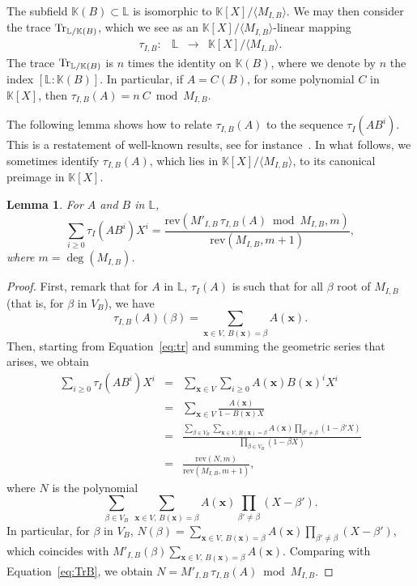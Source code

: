 \documentclass[12pt]{article}
\def\K {\ensuremath{\mathbb{K}}}
\def\L {\ensuremath{\mathbb{L}}}
\def\rev {\ensuremath{\mathrm{rev}}}
\def\x {\ensuremath{\mathbf{x}}}
\newtheorem{Lemma}{Lemma}
\begin{document}
The subfield $\K(B) \subset \L$ is isomorphic to $\K[X]/\langle
M_{I,B} \rangle$. We may then consider the trace
${\rm Tr}_{\L/\K(B)}$, which we see as an $\K[X]/\langle
M_{I,B}\rangle$-linear mapping
$$
\begin{array}{cccc}
\tau_{I,B} :& \L& \to& \K[X]/\langle M_{I,B} \rangle.
\end{array}$$
The trace ${\rm Tr}_{\L/\K(B)}$ is $n$ times the identity on $\K(B)$,
where we denote by $n$ the index $[\L:\K(B)]$. In particular, if
$A=C(B)$, for some polynomial $C$ in $\K[X]$, then $\tau_{I,B}(A)=n
\ C \bmod M_{I,B}$.

The following lemma shows how to relate $\tau_{I,B} (A)$ to the
sequence $\tau_I(A B^i)$. This is a restatement of well-known results,
see for instance~\cite{rouiller99}. In what follows, we sometimes
identify $\tau_{I,B}(A)$, which lies in $\K[X]/\langle M_{I,B} \rangle$,
to its canonical preimage in $\K[X]$.

\begin{Lemma}\label{lemma:trace:1}
  For $A$ and $B$ in $\L$, 
  $$\sum_{i \ge 0} \tau_I(A B^i) X^i = \frac{\rev( M'_{I,B}\, \tau_{I,B}
    (A) \bmod M_{I,B},m)}{\rev(M_{I,B},m+1)},$$ where
  $m=\deg(M_{I,B})$.
\end{Lemma}
\begin{proof}
First, remark that for $A$ in $\L$, $\tau_{I}(A)$ is such that for all
$\beta$ root of $M_{I,B}$ (that is, for $\beta$ in $V_B$), we have
\begin{equation}\label{eq:TrB}
\tau_{I,B}(A)(\beta) = \sum_{\x \in V,\, B(\x)=\beta} A(\x).  
\end{equation}
Then, starting from Equation~\eqref{eq:tr} and summing the geometric
series that arises, we obtain
\begin{eqnarray*}
\sum_{i \ge 0} \tau_I(A B^i) X^i &=& \sum_{\x \in V} \sum_{i \ge 0} A(\x)B(\x)^i X^i\\
&=& \sum_{\x \in V} \frac{A(\x)}{1-B(\x)X}\\
&=& \frac{\sum_{\beta \in V_B} \sum_{\x \in V,\, B(\x)=\beta} A(\x) \prod_{\beta'\ne \beta} (1-\beta' X)}
    {\prod_{\beta \in V_B}(1-\beta X)}\\
&=& \frac{\rev(N,m)}{\rev(M_{I,B},m+1)},
\end{eqnarray*}
where $N$ is the polynomial
$$\sum_{\beta \in V_B}\ \sum_{\x \in V,\, B(\x)=\beta} A(\x) \prod_{\beta'\ne \beta} (X-\beta' ).$$
In particular, for  $\beta$ in $V_B$, $N(\beta)=\sum_{\x \in V,\, B(\x)=\beta} A(\x) \prod_{\beta'\ne \beta} (X-\beta' )$,
which coincides with $M'_{I,B}(\beta)\sum_{\x \in V,\, B(\x)=\beta} A(\x)$.
Comparing with Equation~\eqref{eq:TrB}, we obtain 
$N=M'_{I,B}\, \tau_{I,B}(A) \bmod M_{I,B}$.
\end{proof}
\end{document}
